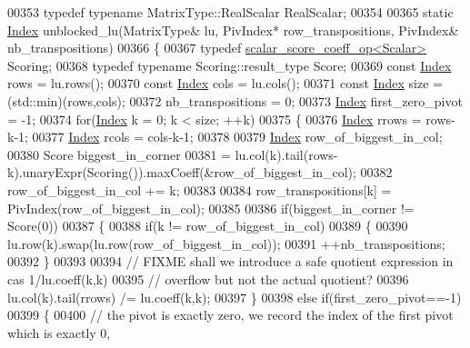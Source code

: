 \begin{DoxyCode}
00353   \textcolor{keyword}{typedef} \textcolor{keyword}{typename} MatrixType::RealScalar RealScalar;
00354 
00365   \textcolor{keyword}{static} \hyperlink{namespace_eigen_a62e77e0933482dafde8fe197d9a2cfde}{Index} unblocked\_lu(MatrixType& lu, PivIndex* row\_transpositions, PivIndex& nb\_transpositions)
00366   \{
00367     \textcolor{keyword}{typedef} \hyperlink{struct_eigen_1_1internal_1_1scalar__score__coeff__op}{scalar\_score\_coeff\_op<Scalar>} Scoring;
00368     \textcolor{keyword}{typedef} \textcolor{keyword}{typename} Scoring::result\_type Score;
00369     \textcolor{keyword}{const} \hyperlink{namespace_eigen_a62e77e0933482dafde8fe197d9a2cfde}{Index} rows = lu.rows();
00370     \textcolor{keyword}{const} \hyperlink{namespace_eigen_a62e77e0933482dafde8fe197d9a2cfde}{Index} cols = lu.cols();
00371     \textcolor{keyword}{const} \hyperlink{namespace_eigen_a62e77e0933482dafde8fe197d9a2cfde}{Index} size = (std::min)(rows,cols);
00372     nb\_transpositions = 0;
00373     \hyperlink{namespace_eigen_a62e77e0933482dafde8fe197d9a2cfde}{Index} first\_zero\_pivot = -1;
00374     \textcolor{keywordflow}{for}(\hyperlink{namespace_eigen_a62e77e0933482dafde8fe197d9a2cfde}{Index} k = 0; k < size; ++k)
00375     \{
00376       \hyperlink{namespace_eigen_a62e77e0933482dafde8fe197d9a2cfde}{Index} rrows = rows-k-1;
00377       \hyperlink{namespace_eigen_a62e77e0933482dafde8fe197d9a2cfde}{Index} rcols = cols-k-1;
00378 
00379       \hyperlink{namespace_eigen_a62e77e0933482dafde8fe197d9a2cfde}{Index} row\_of\_biggest\_in\_col;
00380       Score biggest\_in\_corner
00381         = lu.col(k).tail(rows-k).unaryExpr(Scoring()).maxCoeff(&row\_of\_biggest\_in\_col);
00382       row\_of\_biggest\_in\_col += k;
00383 
00384       row\_transpositions[k] = PivIndex(row\_of\_biggest\_in\_col);
00385 
00386       \textcolor{keywordflow}{if}(biggest\_in\_corner != Score(0))
00387       \{
00388         \textcolor{keywordflow}{if}(k != row\_of\_biggest\_in\_col)
00389         \{
00390           lu.row(k).swap(lu.row(row\_of\_biggest\_in\_col));
00391           ++nb\_transpositions;
00392         \}
00393 
00394         \textcolor{comment}{// FIXME shall we introduce a safe quotient expression in cas 1/lu.coeff(k,k)}
00395         \textcolor{comment}{// overflow but not the actual quotient?}
00396         lu.col(k).tail(rrows) /= lu.coeff(k,k);
00397       \}
00398       \textcolor{keywordflow}{else} \textcolor{keywordflow}{if}(first\_zero\_pivot==-1)
00399       \{
00400         \textcolor{comment}{// the pivot is exactly zero, we record the index of the first pivot which is exactly 0,}

\end{DoxyCode}
